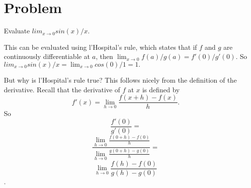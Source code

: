 \documentclass[11pt,a4paper]{report}
\theoremstyle{plain}
\theoremstyle{definition}
\theoremstyle{remark}
\begin{document}
\section*{Problem}
Evaluate $lim_{x\to 0} sin(x)/x$.

This can be evaluated using l'Hospital's rule, which states that if $f$ and $g$ are continuously differentiable at $a$, then $\lim_{x \to 0} {f(a)/g(a)} = f'(0) / g'(0)$.  So $lim_{x\to 0} sin(x)/x = \lim_{x \to 0} {cos(0) / 1} = 1.$

But why is l'Hospital's rule true?  This follows nicely from the definition of the derivative.  Recall that the derivative of $f$ at $x$ is defined by
$$f'(x) = \lim_{h \to 0} \frac{f(x + h) - f(x)}{h}.$$
So $$\frac{f'(0)}{g'(0)} = $$ $$\frac{\mathop{\lim}\limits_{h \to 0} \frac {f(0 + h) - f(0)} {h}} {\mathop{\lim}\limits_{h \to 0} \frac {g(0 + h) - g(0)} {h}} = $$ $$\lim_{h \to 0} \frac {f(h) - f(0)} {g(h) - g(0)}$$.
\end{document}
